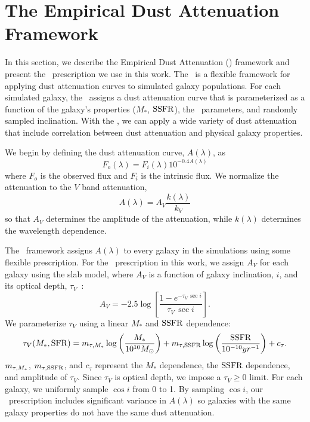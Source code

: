 \section{The Empirical Dust Attenuation Framework} \label{sec:dem}
In this section, we describe the Empirical Dust Attenuation (\eda)
framework and present the \eda~prescription we use in this work. 
The \eda~is a flexible framework for applying dust attenuation curves to
simulated galaxy populations.
For each simulated galaxy, the \eda~assigns a dust attenuation
curve that is parameterized as a function of the galaxy's properties 
($M_*$, ${\rm SSFR}$), the \eda~parameters, and randomly
sampled inclination. With the \eda, we can apply a wide variety of dust
attenuation that include correlation between dust attenuation and physical
galaxy properties. 

We begin by defining the dust attenuation curve, $A(\lambda)$, as 
\begin{equation} \label{eq:full_atten}
    F_o (\lambda) = F_i (\lambda) 10^{-0.4 A(\lambda)}
\end{equation}
where $F_o$ is the observed flux and $F_i$ is the intrinsic flux. We normalize
the attenuation to the $V$ band attenuation, 
\begin{equation} 
    A(\lambda) = A_V \frac{k(\lambda)}{k_V}
\end{equation}
so that $A_V$ determines the amplitude of the attenuation, while $k(\lambda)$
determines the wavelength dependence. 

The \eda~framework assigns $A(\lambda)$ to every galaxy in the simulations
using some flexible prescription. For the \eda~prescription in this work,
we assign $A_V$ for each galaxy using the slab model, where $A_V$ is a
function of galaxy inclination, $i$, and its optical depth,
$\tau_V$~\citep[\eg][]{somerville1999, somerville2012}: 
\begin{equation} \label{eq:slab}
    A_V = -2.5 \log \left[ \frac{1 - e^{-\tau_V\,\sec i}}{\tau_V\,\sec i} \right].
\end{equation}
We parameterize $\tau_V$ using a linear $M_*$ and ${\rm SSFR}$ dependence: 
\begin{equation} \label{eq:tauv}
    \tau_V(M_*, \sfr) = \mtaum \log \left(\frac{M_*}{10^{10} M_\odot}\right) +
    \mtaus \log \left(\frac{\ssfr}{10^{-10}yr^{-1}}\right) + c_\tau.
\end{equation}
$m_{\tau,M_*}$, $m_{\tau,{\rm SSFR}}$, and $c_\tau$ represent the $M_*$ dependence, the ${\rm SSFR}$
dependence, and amplitude of $\tau_V$. Since $\tau_V$ is optical depth, we
impose a $\tau_V \ge 0$ limit.
For each galaxy, we uniformly sample $\cos i$ from 0 to 1. By sampling
$\cos i$, our \eda~prescription includes significant variance in
$A(\lambda)$ so galaxies with the same galaxy properties do not have the
same dust attenuation.

